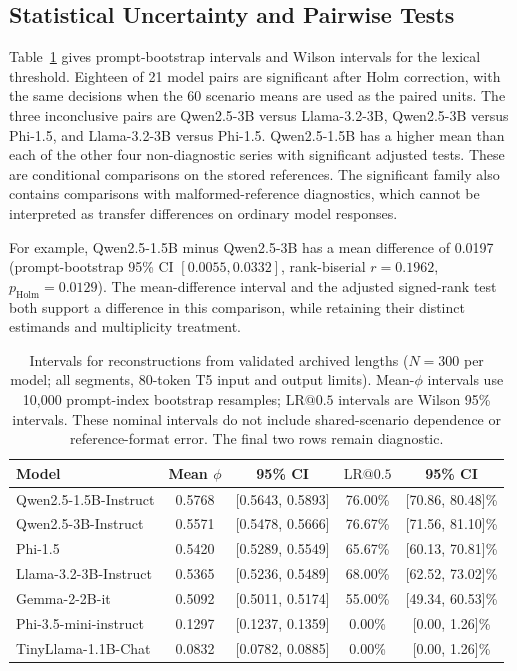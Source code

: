 \documentclass[electronics,article,submit,pdftex,moreauthors]{Definitions/mdpi}
\begin{document}
\subsection{Statistical Uncertainty and Pairwise Tests}
Table~\ref{tab:statistical_results} gives prompt-bootstrap intervals and Wilson intervals for the lexical threshold. Eighteen of 21 model pairs are significant after Holm correction, with the same decisions when the 60 scenario means are used as the paired units. The three inconclusive pairs are Qwen2.5-3B versus Llama-3.2-3B, Qwen2.5-3B versus Phi-1.5, and Llama-3.2-3B versus Phi-1.5. Qwen2.5-1.5B has a higher mean than each of the other four non-diagnostic series with significant adjusted tests. These are conditional comparisons on the stored references. The significant family also contains comparisons with malformed-reference diagnostics, which cannot be interpreted as transfer differences on ordinary model responses.

For example, Qwen2.5-1.5B minus Qwen2.5-3B has a mean difference of 0.0197 (prompt-bootstrap 95\% CI $[0.0055,0.0332]$, rank-biserial $r=0.1962$, $p_{\mathrm{Holm}}=0.0129$). The mean-difference interval and the adjusted signed-rank test both support a difference in this comparison, while retaining their distinct estimands and multiplicity treatment.

\begin{table}[ht]
\centering
\caption{Intervals for reconstructions from validated archived lengths ($N=300$ per model; all segments, 80-token T5 input and output limits). Mean-$\phi$ intervals use 10,000 prompt-index bootstrap resamples; $\mathrm{LR}@0.5$ intervals are Wilson 95\% intervals. These nominal intervals do not include shared-scenario dependence or reference-format error. The final two rows remain diagnostic.}
\label{tab:statistical_results}
\begin{tabular}{l c c c c}
\toprule
Model & Mean $\phi$ & 95\% CI & $\mathrm{LR}@0.5$ & 95\% CI \\
\midrule
Qwen2.5-1.5B-Instruct & 0.5768 & [0.5643, 0.5893] & 76.00\% & [70.86, 80.48]\% \\
Qwen2.5-3B-Instruct & 0.5571 & [0.5478, 0.5666] & 76.67\% & [71.56, 81.10]\% \\
Phi-1.5 & 0.5420 & [0.5289, 0.5549] & 65.67\% & [60.13, 70.81]\% \\
Llama-3.2-3B-Instruct & 0.5365 & [0.5236, 0.5489] & 68.00\% & [62.52, 73.02]\% \\
Gemma-2-2B-it & 0.5092 & [0.5011, 0.5174] & 55.00\% & [49.34, 60.53]\% \\
Phi-3.5-mini-instruct & 0.1297 & [0.1237, 0.1359] & 0.00\% & [0.00, 1.26]\% \\
TinyLlama-1.1B-Chat & 0.0832 & [0.0782, 0.0885] & 0.00\% & [0.00, 1.26]\% \\
\bottomrule
\end{tabular}
\end{table}
\end{document}
